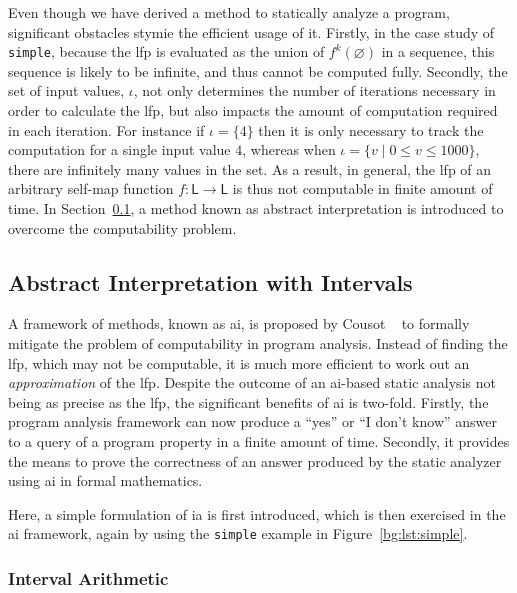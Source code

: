 Even though we have derived a method to statically analyze a program,
significant obstacles stymie the efficient usage of it.  Firstly, in the case
study of \verb|simple|, because the \gls{lfp} is evaluated as the union of
$f^k(\varnothing)$ in a sequence, this sequence is likely to be infinite, and
thus cannot be computed fully.  Secondly, the set of input values, $\iota$,
not only determines the number of iterations necessary in order to calculate
the \gls{lfp}, but also impacts the amount of computation required in each
iteration.  For instance if $\iota = \{4\}$ then it is only necessary to
track the computation for a single input value $4$, whereas when $\iota = \{
v \mid 0 \leq v \leq 1000 \}$, there are infinitely many values in the set.
As a result, in general, the \gls{lfp} of an arbitrary self-map function $f:
\mathsf{L} \to \mathsf{L}$ is thus not computable in finite amount of time.  In
Section~\ref{bg:sub:intervals}, a method known as abstract interpretation is
introduced to overcome the computability problem.


\subsection{Abstract Interpretation with Intervals}
\label{bg:sub:intervals}

A framework of methods, known as \gls{ai}, is proposed by Cousot
\etal~\cite{cousot77} to formally mitigate the problem of computability
in program analysis.  Instead of finding the \gls{lfp}, which may not be
computable, it is much more efficient to work out an \emph{approximation} of
the \gls{lfp}\@.  Despite the outcome of an \gls{ai}-based static analysis not
being as precise as the \gls{lfp}, the significant benefits of \gls{ai} is
two-fold.  Firstly, the program analysis framework can now produce a ``yes'' or
``I don't know'' answer to a query of a program property in a finite amount of
time.  Secondly, it provides the means to prove the correctness of an answer
produced by the static analyzer using \gls{ai} in formal mathematics.

Here, a simple formulation of \acrlong{ia} is first introduced, which is then
exercised in the \gls{ai} framework, again by using the \verb|simple| example
in Figure~\ref{bg:lst:simple}.

\subsubsection{Interval Arithmetic}
\label{bg:ssub:interval}


